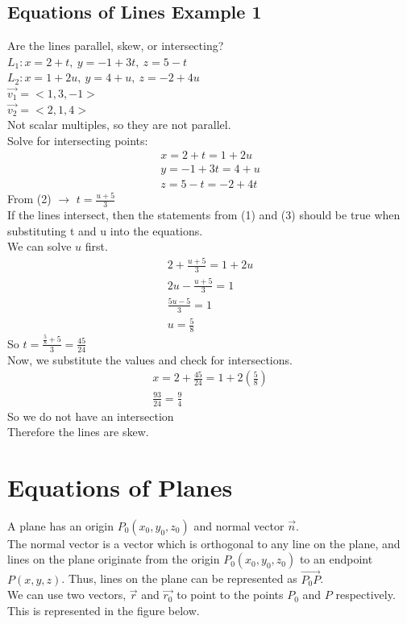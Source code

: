 \documentclass[12pt]{article}
\begin{document}
\subsection{Equations of Lines Example 1}
Are the lines parallel, skew, or intersecting?\\%
$L_1: x = 2 + t,\ y = -1 + 3t,\ z = 5-t$\\%
$L_2: x = 1 + 2u,\ y = 4 + u,\ z = -2 + 4u$\\%
$\vec{v_1}=<1, 3, -1>  $\\%
$\vec{v_2} =<2,1,4> $\\%
Not scalar multiples, so they are not parallel.\\%
Solve for intersecting points:
\begin{align}
	x=2+t=1+2u\\%
	y=-1+3t=4+u\\%
	z=5-t=-2+4t
\end{align}
From (2) $\rightarrow$  \(t=\frac{u+5}{3}\)\\%
If the lines intersect, then the statements from (1) and (3) should be true when substituting t and u into the equations.
\\We can solve \(u\) first.
\begin{align}
	2+\frac{u+5}{3}=1+2u\\%
	2u-\frac{u+5}{3}=1\\%
	\frac{5u-5}{3}=1\\%
	u = \frac{5}{8}
\end{align}
So \(t=\frac{\frac{5}{8}+5}{3}= \frac{45}{24}\)\\%
Now, we substitute the values and check for intersections.
\begin{align}
	x=2+\frac{45}{24}=1+2 (\frac{5}{8})\\%
	\frac{93}{24}=\frac{9}{4}
\end{align}
So we do not have an intersection\\%
Therefore the lines are skew.

\section{Equations of Planes}

A plane has an origin \(P_0(x_0,y_0,z_0)\) and normal vector \(\vec{n} \).\\%
The normal vector is a vector which is orthogonal to any line on the plane, and lines on the plane originate from the origin \(P_0(x_0,y_0,z_0)\) to an endpoint \(P(x,y,z)\). Thus, lines on the plane can be represented as \(\vec{P_0P} \). \\%
We can use two vectors, \(\vec{r}\) and  \( \vec{r_0} \) to point to the points \(P_0\) and \(P\) respectively. This is represented in the figure below.
\end{document}
